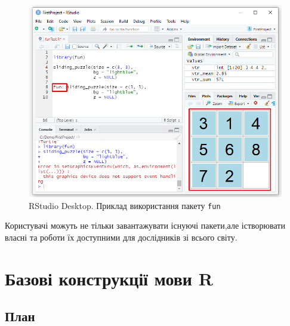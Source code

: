 \documentclass[
]{book}
\begin{document}
\begin{figure}
\centering
\includegraphics{images/chapter1/packages_4.png}
\caption{\label{fig:unnamed-chunk-34}RStudio Desktop. Приклад використання пакету \texttt{fun}}
\end{figure}

Користувачі можуть не тільки завантажувати існуючі пакети,але істворювати власні та роботи їх доступними для дослідників зі всього світу.

\hypertarget{chapter2}{%
\chapter{Базові конструкції мови R}\label{chapter2}}

\hypertarget{ux43fux43bux430ux43d-1}{%
\section*{План}\label{ux43fux43bux430ux43d-1}}
\end{document}

